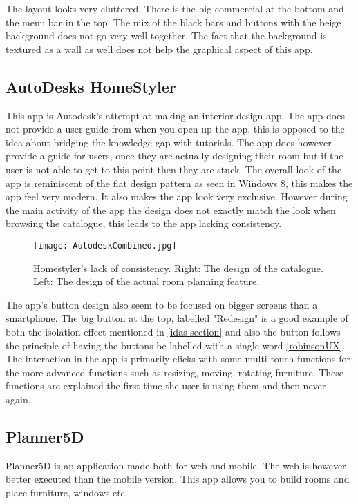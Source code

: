 The layout looks very cluttered. There is the big commercial at the bottom and the menu bar in the top. 
The mix of the black bars and buttons with the beige background does not go very well together. The fact that the background is textured as a wall as well does not help the graphical aspect of this app. 

\subsection{AutoDesks HomeStyler}
This app is Autodesk's attempt at making an interior design app. The app does not provide a user guide from when you open up the app, this is opposed to the idea about bridging the knowledge gap with tutorials. The app does however provide a guide for users, once they are actually designing their room but if the user is not able to get to this point then they are stuck. The overall look of the app is reminiscent of the flat design pattern as seen in Windows 8, this makes the app feel very modern. It also makes the app look very exclusive. However during the main activity of the app the design does not exactly match the look when browsing the catalogue, this leads to the app lacking consistency. 

\begin{figure}[H]
\centering
\texttt{[image: AutodeskCombined.jpg]}
\caption{Homestyler's lack of consistency. Right: The design of the catalogue. Left: The design of the actual room planning feature.}
\end{figure}

The app's button design also seem to be focused on bigger screens than a smartphone. The 
big button at the top, labelled "Redesign" is a good example of both the isolation effect mentioned in \ref{idas 
section} and also the button follows the principle of having the buttons be labelled with a single word 
\ref{robinsonUX}. The interaction in the app is primarily clicks with some multi touch functions for the more advanced functions such as resizing, moving, rotating furniture. These functions are explained the first time the user is using them and then never again.

\subsection{Planner5D}
Planner5D is an application made both for web and mobile. The web is however better executed than the mobile version. This app allows you to build rooms and place furniture, windows etc. 

